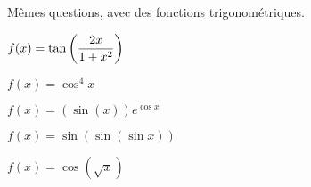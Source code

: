 \documentclass[a4paper, 11pt,reqno]{article}
\begin{document}
\begin{exercice}  \;  M\^emes questions, avec des fonctions trigonom\'etriques.\\
	\begin{enumerate}
		\begin{minipage}[t]{0.45\textwidth}
			\item $f(x)=\tan{\left( \displaystyle\frac{2x}{1+x^2} \right)}$
			\item $f(x)=\cos^4{x}$
		\end{minipage}
		\begin{minipage}[t]{0.45\textwidth}
			\item $f(x)=(\sin{(x)})e^{\cos{x}}$
			\item $f(x)=\sin{(\sin{(\sin{x})})}$
			\item $f(x)=\cos{(\sqrt{x})}$
		\end{minipage}
	\end{enumerate}
\end{exercice}
\end{document}
